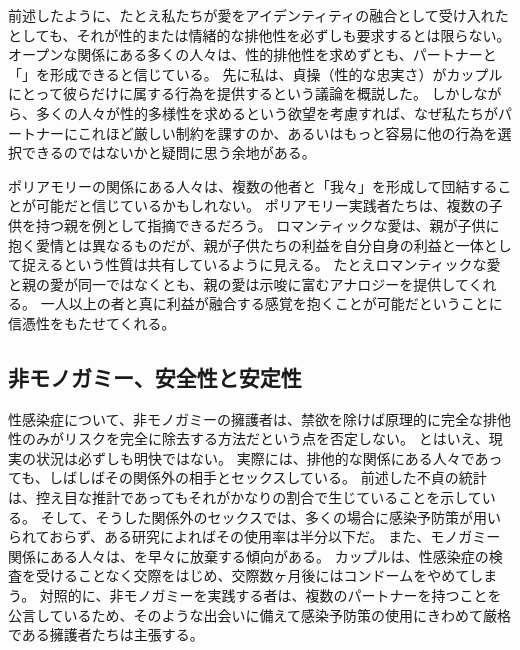 \documentclass[paper=a4,book,openany]{jlreq}
\begin{document}
前述したように、たとえ私たちが愛をアイデンティティの融合として受け入れたとしても、それが性的または情緒的な排他性を必ずしも要求するとは限らない。
オープンな関係にある多くの人々は、性的排他性を求めずとも、パートナーと「」を形成できると信じている。
先に私は、貞操（性的な忠実さ）がカップルにとって彼らだけに属する行為を提供するという議論を概説した。
しかしながら、多くの人々が性的多様性を求めるという欲望を考慮すれば、なぜ私たちがパートナーにこれほど厳しい制約を課すのか、あるいはもっと容易に他の行為を選択できるのではないかと疑問に思う余地がある。

ポリアモリーの関係にある人々は、複数の他者と「我々」を形成して団結することが可能だと信じているかもしれない。
ポリアモリー実践者たちは、複数の子供を持つ親を例として指摘できるだろう。
ロマンティックな愛は、親が子供に抱く愛情とは異なるものだが、親が子供たちの利益を自分自身の利益と一体として捉えるという性質は共有しているように見える。
たとえロマンティックな愛と親の愛が同一ではなくとも、親の愛は示唆に富むアナロジーを提供してくれる。
一人以上の者と真に利益が融合する感覚を抱くことが可能だということに信憑性をもたせてくれる。

\subsection{非モノガミー、安全性と安定性}

性感染症について、非モノガミーの擁護者は、禁欲を除けば原理的に完全な排他性のみがリスクを完全に除去する方法だという点を否定しない。
とはいえ、現実の状況は必ずしも明快ではない。
実際には、排他的な関係にある人々であっても、しばしばその関係外の相手とセックスしている。
前述した不貞の統計は、控え目な推計であってもそれがかなりの割合で生じていることを示している。
そして、そうした関係外のセックスでは、多くの場合に感染予防策が用いられておらず、ある研究によればその使用率は半分以下だ\citep{conley12:_unfait_indiv_are_less_likel}。
また、モノガミー関係にある人々は、を早々に放棄する傾向がある。
カップルは、性感染症の検査を受けることなく交際をはじめ、交際数ヶ月後にはコンドームをやめてしまう\citep{glauser11:_how_talk_patien_sti_screen}。
対照的に、非モノガミーを実践する者は、複数のパートナーを持つことを公言しているため、そのような出会いに備えて感染予防策の使用にきわめて厳格である擁護者たちは主張する\citep{soh16:_insig_kinky_nonmon_sex}。
\end{document}
